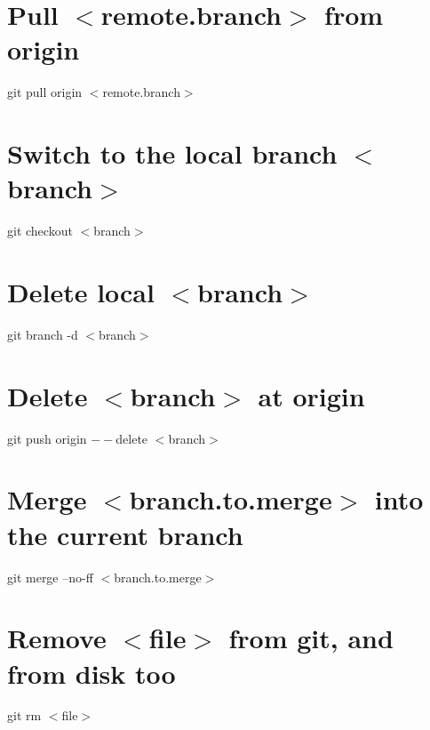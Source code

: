 \documentclass[]{article}
\begin{document}
\section{Pull $<$remote.branch$>$ from origin}
git pull origin $<$remote.branch$>$

\section{Switch to the local branch $<$branch$>$}
git checkout $<$branch$>$

\section{Delete local $<$branch$>$}
git branch -d $<$branch$>$

\section{Delete $<$branch$>$ at origin}
git push origin $--$delete $<$branch$>$

\section{Merge $<$branch.to.merge$>$ into the current branch}
git merge --no-ff $<$branch.to.merge$>$

\section{Remove $<$file$>$ from git, and from disk too}
git rm $<$file$>$



\end{document}
